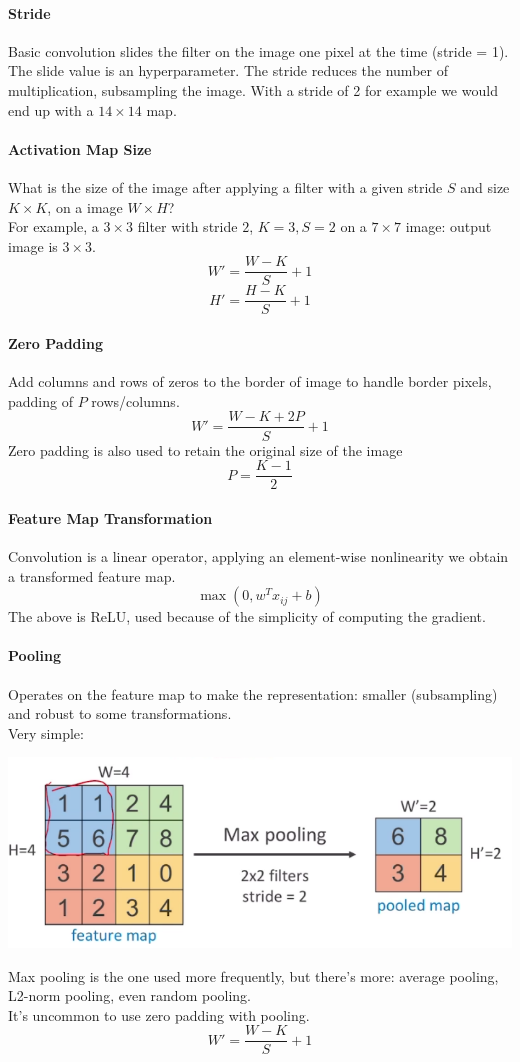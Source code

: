 \documentclass[10pt]{report}
\begin{document}
\paragraph{Stride} Basic convolution slides the filter on the image one pixel at the time (stride = 1). The slide value is an hyperparameter. The stride reduces the number of multiplication, subsampling the image. With a stride of 2 for example we would end up with a $14\times14$ map.
\paragraph{Activation Map Size} What is the size of the image after applying a filter with a given stride $S$ and size $K\times K$, on a image $W\times H$?\\
For example, a $3\times 3$ filter with stride $2$, $K=3, S=2$ on a $7\times 7$ image: output image is $3\times 3$.
$$W'=\frac{W-K}{S}+1$$
$$H'=\frac{H-K}{S}+1$$
\paragraph{Zero Padding} Add columns and rows of zeros to the border of image to handle border pixels, padding of $P$ rows/columns.
$$W'=\frac{W-K+2P}{S}+1$$
Zero padding is also used to retain the original size of the image
$$P=\frac{K-1}{2}$$
\paragraph{Feature Map Transformation} Convolution is a linear operator, applying an element-wise nonlinearity we obtain a transformed feature map.
$$\max(0, w^Tx_{ij} + b)$$
The above is ReLU, used because of the simplicity of computing the gradient.
\paragraph{Pooling} Operates on the feature map to make the representation: smaller (subsampling) and robust to some transformations.\\
Very simple: \begin{center}
	\includegraphics[scale=0.5]{54.png}
\end{center}
Max pooling is the one used more frequently, but there's more: average pooling, L2-norm pooling, even random pooling.\\
It's uncommon to use zero padding with pooling.
$$W' = \frac{W-K}{S} + 1$$
\end{document}
